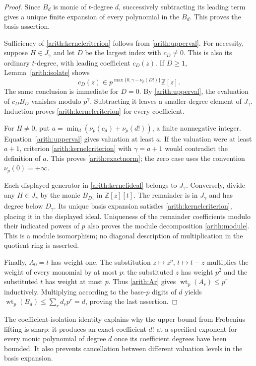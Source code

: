 \documentclass[11pt,a4paper]{article}
\theoremstyle{definition}
\theoremstyle{remark}\newtheorem{remark}[lemma]{Remark}
\begin{document}
\begin{proof}
Since $B_d$ is monic of $t$-degree $d$, successively subtracting its
leading term gives a unique finite expansion of every polynomial in the
$B_d$. This proves the basis assertion.

Sufficiency of \eqref{arith:kernelcriterion} follows from
\eqref{arith:upperval}. For necessity, suppose $H\in J_\gamma$ and let
$D$ be the largest index with $c_D\ne0$. This is also its ordinary
$t$-degree, with leading coefficient $c_D(z)$. If $D\geq1$,
Lemma~\ref{arith:isolate} shows
\[
 c_D(z)\in p^{\max\{0,\gamma-\nu_p(D!)\}}\mathbb Z[z].
\]
The same conclusion is immediate for $D=0$. By
\eqref{arith:upperval}, the evaluation of $c_DB_D$ vanishes modulo
$p^\gamma$. Subtracting it leaves a smaller-degree element of $J_\gamma$.
Induction proves \eqref{arith:kernelcriterion} for every coefficient.

For $H\ne0$, put $a=\min_d(\nu_p(c_d)+\nu_p(d!))$, a finite
nonnegative integer. Equation~\eqref{arith:upperval} gives valuation at
least $a$. If the valuation were at least $a+1$, criterion
\eqref{arith:kernelcriterion} with $\gamma=a+1$ would contradict the
definition of $a$. This proves \eqref{arith:exactnorm}; the zero case
uses the convention $\nu_p(0)=+\infty$.

Each displayed generator in \eqref{arith:kernelideal} belongs to
$J_\gamma$. Conversely, divide any $H\in J_\gamma$ by the monic
$B_{D_\gamma}$ in $\mathbb Z[z][t]$. The remainder is in $J_\gamma$
and has degree below $D_\gamma$. Its unique basis expansion satisfies
\eqref{arith:kernelcriterion}, placing it in the displayed ideal.
Uniqueness of the remainder coefficients modulo their indicated powers
of $p$ also proves the module decomposition \eqref{arith:module}.
This is a module isomorphism; no diagonal description of multiplication
in the quotient ring is asserted.

Finally, $A_0=t$ has weight one. The substitution $z\mapsto z^p$,
$t\mapsto t-z$ multiplies the weight of every monomial by at most $p$:
the substituted $z$ has weight $p^2$ and the substituted $t$ has weight
at most $p$. Thus \eqref{arith:Ar} gives
$\operatorname{wt}_p(A_r)\leq p^r$ inductively. Multiplying according
to the base-$p$ digits of $d$ yields
$\operatorname{wt}_p(B_d)\leq\sum_rd_rp^r=d$, proving the last assertion.
\end{proof}

The coefficient-isolation identity explains why the upper bound from
Frobenius lifting is sharp: it produces an exact coefficient $d!$ at a
specified exponent for every monic polynomial of degree $d$ once its
coefficient degrees have been bounded. It also prevents cancellation
between different valuation levels in the basis expansion.
\end{document}

